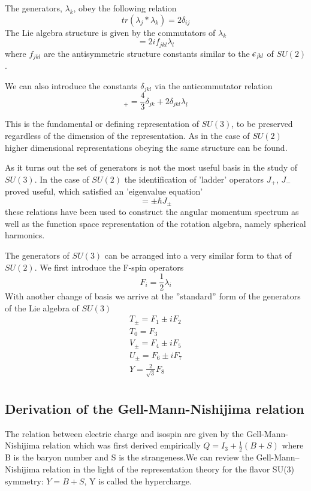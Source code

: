 \documentclass[main.tex]{subfiles}
\begin{document}
The generators, $\lambda_k$, obey the following relation
\begin{equation*}
tr(\lambda_j*\lambda_k)=2\delta_{ij}
\end{equation*}
The Lie algebra structure is given by the commutators of $\lambda_k$
\begin{equation*}
 [\lambda_j,\lambda_k]=2if_{jkl}\lambda_l
\end{equation*}
where $f_{jkl}$ are the antisymmetric structure constants similar to the $\epsilon_{jkl}$ of $SU(2)$.

We can also introduce the constants $\delta_{jkl}$ via the anticommutator relation
\begin{equation*}
[\lambda_j,\lambda_k]_+=\frac{4}{3}\delta_{jk}+2\delta_{jkl}\lambda_l
\end{equation*}

This is the fundamental or defining representation of $SU(3)$, to be preserved regardless of the dimension of the representation. As in the case of $SU(2)$ higher dimensional representations obeying the same structure can be found.

As it turns out the set of generators is not the most useful basis in the study of $SU(3)$. In the case of $SU(2)$ the identification of 'ladder' operators $J_+$, $J_-$ proved useful, which satisfied an 'eigenvalue equation'
\begin{equation*}
[J_0,J_{\pm}]=\pm\hbar J_{\pm}
\end{equation*}
these relations have been used to construct the angular momentum spectrum as well as the function space representation of the rotation algebra, namely spherical harmonics.

The generators of $SU(3)$ can be arranged into a very similar form to that of $SU(2)$. We first introduce the F-spin operators
\begin{equation*}
F_i=\frac{1}{2}\lambda_i
\end{equation*}
With another change of basis we arrive at the ''standard'' form of the generators of the Lie algebra of $SU(3)$
\begin{align*}
T_{\pm}=F_1\pm iF_2\\
T_0=F_3\\
V_{\pm}=F_4\pm iF_5\\
U_{\pm}=F_6\pm iF_7\\
Y=\frac{2}{\sqrt{3}}F_8\\
\end{align*}

\subsection{Derivation of the Gell-Mann-Nishijima relation}
The relation between electric charge and isospin are given by the Gell-Mann-Nishijima relation which was first derived empirically
$Q=I_3+\frac{1}{2}(B + S)$
where B is the baryon number and S is the strangeness.We can review the Gell-Mann–Nishijima relation in the light of the representation theory for the flavor SU(3) symmetry: $Y=B+S$, Y is called the hypercharge.
\end{document}

